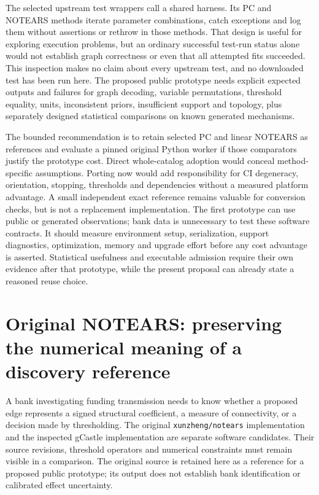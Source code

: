The selected upstream test wrappers call a shared harness. Its PC and NOTEARS
methods iterate parameter combinations, catch exceptions and log them without
assertions or rethrow in those methods. That design is useful for exploring
execution problems, but an ordinary successful test-run status alone would not
establish graph correctness or even that all attempted fits succeeded. This
inspection makes no claim about every upstream test, and no downloaded test has
been run here. The proposed public prototype needs explicit expected outputs and
failures for graph decoding, variable permutations, threshold equality, units,
inconsistent priors, insufficient support and topology, plus separately designed
statistical comparisons on known generated mechanisms.
\citep{exec20_gcastle_source,exec20_gcastle_reference}

The bounded recommendation is to retain selected PC and linear NOTEARS as
references and evaluate a pinned original Python worker if those comparators
justify the prototype cost. Direct whole-catalog adoption would conceal
method-specific assumptions. Porting now would add responsibility for CI
degeneracy, orientation, stopping, thresholds and dependencies without a measured
platform advantage. A small independent exact reference remains valuable for
conversion checks, but is not a replacement implementation. The first prototype
can use public or generated observations; bank data is unnecessary to test these
software contracts. It should measure environment setup, serialization, support
diagnostics, optimization, memory and upgrade effort before any cost advantage
is asserted. Statistical usefulness and executable admission require their own
evidence after that prototype, while the present proposal can already state a
reasoned reuse choice.


\section{Original NOTEARS: preserving the numerical meaning of a discovery reference}
\label{exec23:notears-scope}
A bank investigating funding transmission needs to know whether a proposed
edge represents a signed structural coefficient, a measure of connectivity,
or a decision made by thresholding. The original \texttt{xunzheng/notears}
implementation and the inspected gCastle implementation are separate software
candidates. Their source revisions, threshold operators and numerical
constraints must remain visible in a comparison. The original source is
retained here as a reference for a proposed public prototype; its output does
not establish bank identification or calibrated effect uncertainty.
\citep{exec23_notears_source,exec20_gcastle_source}

